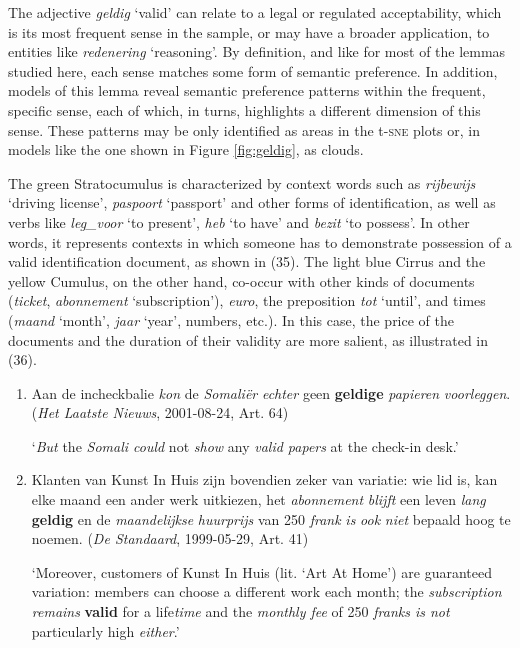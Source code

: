 \documentclass[
]{book}
\begin{document}
The adjective \emph{geldig} `valid' can relate to a legal or regulated acceptability, which is its most frequent sense in the sample, or may have a broader application, to entities like \emph{redenering} `reasoning'. By definition, and like for most of the lemmas studied here, each sense matches some form of semantic preference. In addition, models of this lemma reveal semantic preference patterns within the frequent, specific sense, each of which, in turns, highlights a different dimension of this sense. These patterns may be only identified as areas in the t-\textsc{sne} plots or, in models like the one shown in Figure \ref{fig:geldig}, as clouds.

The green Stratocumulus is characterized by context words such as \emph{rijbewijs} `driving license', \emph{paspoort} `passport' and other forms of identification, as well as verbs like \emph{leg\_voor} `to present', \emph{heb} `to have' and \emph{bezit} `to possess'. In other words, it represents contexts in which someone has to demonstrate possession of a valid identification document, as shown in (35). The light blue Cirrus and the yellow Cumulus, on the other hand, co-occur with other kinds of documents (\emph{ticket}, \emph{abonnement} `subscription'), \emph{euro}, the preposition \emph{tot} `until', and times (\emph{maand} `month', \emph{jaar} `year', numbers, etc.). In this case, the price of the documents and the duration of their validity are more salient, as illustrated in (36).

\begin{enumerate}
\def\labelenumi{(\arabic{enumi})}
\setcounter{enumi}{34}
\item
  Aan de incheckbalie \emph{kon} de \emph{Somaliër} \emph{echter} geen \textbf{geldige} \emph{papieren} \emph{voorleggen}. (\emph{Het Laatste Nieuws}, 2001-08-24, Art. 64)

  `\emph{But} the \emph{Somali could} not \emph{show} any \emph{valid papers} at the check-in desk.'
\item
  Klanten van Kunst In Huis zijn bovendien zeker van variatie: wie lid is, kan elke maand een ander werk uitkiezen, het \emph{abonnement} \emph{blijft} een leven \emph{lang} \textbf{geldig} en de \emph{maandelijkse} \emph{huurprijs} van 250 \emph{frank} \emph{is} \emph{ook} \emph{niet} bepaald hoog te noemen. (\emph{De Standaard}, 1999-05-29, Art. 41)

  `Moreover, customers of Kunst In Huis (lit. `Art At Home') are guaranteed variation: members can choose a different work each month; the \emph{subscription remains} \textbf{valid} for a life\emph{time} and the \emph{monthly fee} of 250 \emph{franks is not} particularly high \emph{either}.'
\end{enumerate}
\end{document}
